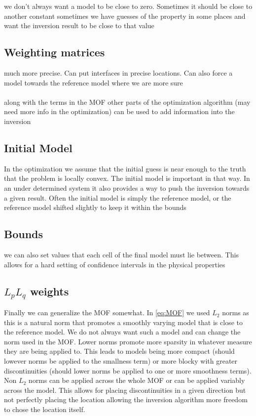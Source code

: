 we don't always want a model to be close to zero. Sometimes it should be close to another constant sometimes we have guesses of the property in some places and want the inversion result to be close to that value

\subsection{Weighting matrices}
\label{sec:Weighting matrices}

much more precise. Can put interfaces in precise locations. Can also force a model towards the reference model where we are more sure
\\\\
along with the terms in the \ac{MOF} other parts of the optimization algorithm (may need more info in the optimization) can be used to add information into the inversion

\subsection{Initial Model}
\label{sec:Initial Model}

In the optimization we assume that the initial guess is near enough to the truth that the problem is locally convex. The initial model is important in that way. In an under determined system it also provides a way to push the inversion towards a given result. Often the initial model is simply the reference model, or the reference model shifted slightly to keep it within the bounds

\subsection{Bounds}
\label{sec:Bounds}

we can also set values that each cell of the final model must lie between. This allows for a hard setting of confidence intervals in the physical properties

\subsection{$L_p L_q$ weights}
\label{sec:Lp Lq weights}

Finally we can generalize the \ac{MOF} somewhat. In \autoref{eq:MOF} we used $L_2$ norms as this is a natural norm that promotes a smoothly varying model that is close to the reference model. We do not always want such a model and can change the norm used in the \ac{MOF}. Lower norms promote more sparsity in whatever measure they are being applied to. This leads to models being more compact (should lowever norms be applied to the smallness term) or more blocky with greater discontinuities (should lower norms be applied to one or more smoothness terms). Non $L_2$ norms can be applied across the whole \ac{MOF} or can be applied variably across the model. This allows for placing discontinuities in a given direction but not perfectly placing the location allowing the inversion algorithm more freedom to chose the location itself.

